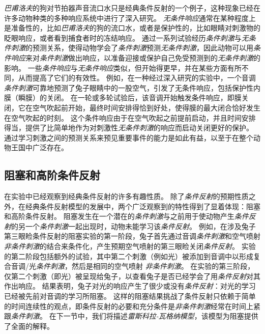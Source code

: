 \textit{巴甫洛夫}的狗对节拍器声音流口水只是经典条件反射的一个例子，这种现象已经在许多动物种类的多种响应系统中进行了深入研究。
\textit{无条件响应}通常在某种程度上是准备性的，比如\textit{巴甫洛夫}的狗的流口水，或者是保护性的，比如眼睛对刺激物的眨眼响应，或者看到捕食者时的冻结响应。
通过一系列试验经历\textit{条件刺激}与\textit{无条件刺激}的预测关系，使得动物学会了\textit{条件刺激}预测\textit{无条件刺激}，因此动物可以用\textit{条件响应}来对\textit{条件刺激}做出响应，以准备迎接或保护自己免受预测到的\textit{无条件刺激}的影响。
一些\textit{条件响应}与\textit{无条件响应}类似，但开始得更早，并在某些方面有所不同，从而提高了它们的有效性。
例如，在一种经过深入研究的实验中，一个音调\textit{条件刺激}可靠地预测了兔子眼睛中的一股空气，引发了无条件响应，包括保护性内膜（瞬膜）的关闭。
在一轮或多轮试验后，该音调开始触发条件响应，即膜关闭，它在空气吹起前开始，最终时间安排得恰到好处，使得膜的最大闭合恰好发生在空气吹起的时刻。
这个条件响应由于在空气吹起之前提前启动，并且时间安排得当，提供了比简单地作为对刺激性\textit{无条件刺激}的响应而启动关闭更好的保护。
通过学习刺激之间的预测关系来预见重要事件的能力是如此有益，以至于在整个动物王国中广泛存在。


\subsection{阻塞和高阶条件反射} \label{sec:blocking_higher_order}

在实验中已经观察到经典条件反射的许多有趣性质。
除了\textit{条件反射}的预期性质之外，在经典条件反射模型的发展中，两个广泛观察到的特性得到了显着体现：阻塞和高阶条件反射。
阻塞发生在一个潜在的\textit{条件刺激}与之前用于使动物产生\textit{条件反射}的另一个\textit{条件刺激}一起出现时，动物未能学习该\textit{条件反射}。
例如，在涉及兔子第三眼睑条件反射的阻塞实验的第一阶段，兔子首先通过音调\textit{条件刺激}和空气喷射 \textit{非条件刺激}的结合来条件化，产生预期空气喷射的第三眼睑关闭\textit{条件反射}。
实验的第二阶段包括额外的试验，其中第二个刺激（例如光）被添加到音调中以形成复合音调/光\textit{条件刺激}，然后是相同的空气喷射 \textit{非条件刺激}。
在实验的第三阶段，仅第二个刺激（即光）被呈现给兔子，以查看兔子是否已经学会了用\textit{条件反射}对其作出响应。
结果表明，兔子对光的响应产生了很少或没有\textit{条件反射}：对光的学习已经被先前对音调的学习所阻塞。
这样的阻塞结果挑战了条件反射只依赖于简单的时间连续性的观点，即条件反射的必要和充分条件是\textit{非条件刺激}经常在时间上紧跟\textit{条件刺激}。
在下一节中，我们将描述\textit{雷斯科拉-瓦格纳模型}\cite{rescorla1972theory}，该模型为阻塞提供了全面的解释。



